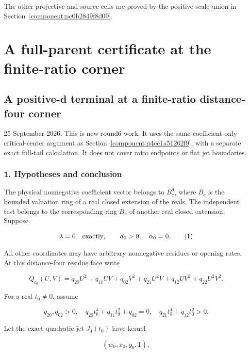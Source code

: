 The other projective and source cells are proved by the positive-scale union in Section~\ref{component:pc0b2849f8d09}.


\section{\texorpdfstring{A full-parent certificate at the finite-ratio corner}{A full-parent certificate at the finite-ratio corner}}
\label{component:p03b551f2a9a0}
\hypertarget{a-positive-d-terminal-at-a-finite-ratio-distance-four-corner}{%
\subsection*{A positive-d terminal at a finite-ratio distance-four corner}\label{p03b551f2a9a0:a-positive-d-terminal-at-a-finite-ratio-distance-four-corner}}

25 September 2026. This is new round6 work. It uses the same coefficient-only
critical-center argument as Section~\ref{component:p4ec1a51262f9}, with a
separate exact full-tail calculation. It does not cover ratio endpoints or
flat jet boundaries.

\hypertarget{hypotheses-and-conclusion}{%
\subsubsection*{1. Hypotheses and conclusion}\label{p03b551f2a9a0:hypotheses-and-conclusion}}

The physical nonnegative coefficient vector belongs to \(B_c^9\), where
\(B_c\) is the bounded valuation ring of a real closed extension of the
reals. The independent test belongs to the corresponding ring \(B_s\) of
another real closed extension. Suppose

\[
\lambda=0\quad\hbox{exactly},\qquad d_0>0,\quad\alpha_0=0.
\tag{1}
\]

All other coordinates may have arbitrary nonnegative residues or opening
rates. At this distance-four residue face write

\[
Q_{c_0}(U,V)=q_{20}U^2+q_{11}UV+q_{02}V^2
+q_{21}U^2V+q_{12}UV^2+q_{22}U^2V^2.
\]

For a real \(t_0\ne0\), assume

\[
q_{20},q_{02}>0,\quad
q_{20}t_0^4+q_{11}t_0^2+q_{02}=0,
\quad q_{21}t_0^4+q_{12}t_0^2>0.
\tag{2}
\]

Let the exact quadratic jet \(J_4(t_0)\) have kernel

\[
(w_0,x_0,y_0,1),
\]

